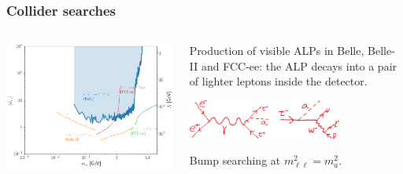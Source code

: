 \documentclass[mathserif, 10pt, aspectratio=169]{beamer}
\begin{document}
\begin{frame}\frametitle{Collider searches}
    \begin{columns}
        \begin{column}{0.49\textwidth}
            \includegraphics[width=\columnwidth]{figures/directsearches.png}
        \end{column}
        \begin{column}{0.5\textwidth}
            Production of visible ALPs in Belle, Belle-II and FCC-ee: the ALP decays into a pair of lighter leptons inside the detector.
            \begin{center}
                \includegraphics[width=0.7\textwidth]{figures/collider.png}
            \end{center}
            Bump searching at $m^2_{\ell\ell} = m_a^2$.
        \end{column}
    \end{columns}
\end{frame}
\end{document}
